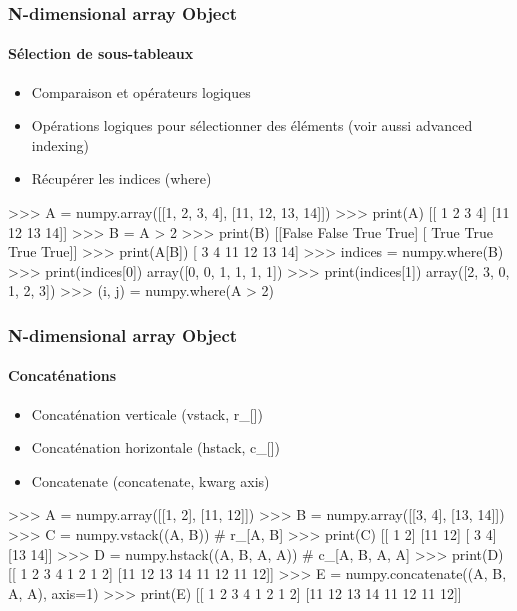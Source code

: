 \begin{frame}[fragile]
\frametitle{N-dimensional array Object}
\framesubtitle{Sélection de sous-tableaux}
\begin{itemize}
 \item Comparaison et opérateurs logiques
 \item Opérations logiques pour sélectionner des éléments (voir aussi advanced indexing)
 \item Récupérer les indices (where)
\end{itemize}
\begin{pythonConsole}
>>> A = numpy.array([[1, 2, 3, 4], [11, 12, 13, 14]])
>>> print(A)
[[ 1  2  3  4]
 [11 12 13 14]]
>>> B = A > 2
>>> print(B)
[[False False  True  True]
 [ True  True  True  True]]
>>> print(A[B])
[ 3  4 11 12 13 14]
>>> indices = numpy.where(B)
>>> print(indices[0])
array([0, 0, 1, 1, 1, 1])
>>> print(indices[1])
array([2, 3, 0, 1, 2, 3])
>>> (i, j) = numpy.where(A > 2)
\end{pythonConsole}
\end{frame}
\begin{frame}[fragile]
\frametitle{N-dimensional array Object}
\framesubtitle{Concaténations}
\begin{itemize}
 \item Concaténation verticale (vstack, r\_[])
 \item Concaténation horizontale (hstack, c\_[])
 \item Concatenate (concatenate, kwarg axis)
\end{itemize}
\begin{pythonConsole}
>>> A = numpy.array([[1, 2], [11, 12]])
>>> B = numpy.array([[3, 4], [13, 14]])
>>> C = numpy.vstack((A, B)) # r\_[A, B]
>>> print(C)
[[ 1  2]
 [11 12]
 [ 3  4]
 [13 14]]
>>> D = numpy.hstack((A, B, A, A)) # c\_[A, B, A, A]
>>> print(D)
[[ 1  2  3  4  1  2  1  2]
 [11 12 13 14 11 12 11 12]]
>>> E = numpy.concatenate((A, B, A, A), axis=1)
>>> print(E)
[[ 1  2  3  4  1  2  1  2]
 [11 12 13 14 11 12 11 12]]
\end{pythonConsole}
\end{frame}
